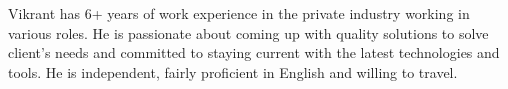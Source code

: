 

\begin{cvparagraph}

Vikrant has 6+ years of work experience in the private industry working in various roles. He is passionate about coming up with quality solutions to solve client's needs and committed to staying current with the latest technologies and tools. He is independent, fairly proficient in English and willing to travel.
\end{cvparagraph}
